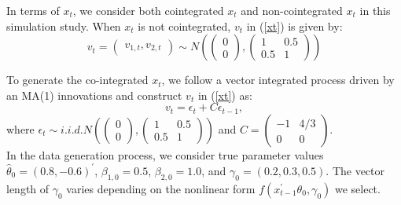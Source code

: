 \documentclass[a4paper,12pt,times,numbered,print,index]{report}
\numberwithin{equation}{section}
\begin{document}
	
	
In terms of $x_t$, we consider both cointegrated $x_t$ and non-cointegrated $x_t$ in this simulation study. When $x_t$ is not cointegrated, $v_t$ in (\ref{xt}) is given by:
$$
	v_{t} =\left(\begin{array}{c}
	v_{1, t}, 
	v_{2, t}
	\end{array}\right) \sim N\left(\left(\begin{array}{c}
	0 \\
	0
	\end{array}\right),\left(\begin{array}{cc}
	1 & 0.5 \nonumber \\
	0.5 & 1
	\end{array}\right)\right)
$$
	
To generate the co-integrated $x_t$, we follow a vector integrated process driven by an MA(1) innovations and construct $v_t$ in (\ref{xt}) as:
$$v_t = \epsilon_t + C\epsilon_{t-1},$$
where $\epsilon_{t} \sim i.i.d. N\left(\left(\begin{array}{c}
0 \\
0
\end{array}\right)
,\left(\begin{array}{cc}1 & 0.5 \\ 0.5 & 1\end{array}\right)\right)$ and $C=\left(\begin{array}{cc} -1  & 4/ 3 \\ 0 & 0\end{array}\right)$. 
\\
	
In the data generation process, we consider true parameter values $\hat{\theta}_0 = (0.8, -0.6)^{\prime}$, $\beta_{1,0} = 0.5$, $\beta_{2,0} = 1.0$, and $\gamma_0 = (0.2, 0.3, 0.5)$. The vector length of $\gamma_{0}$ varies depending on the nonlinear form $f\left(x_{t-1}^{\prime }\theta _{0},\gamma _{0}\right)$ we select. 
	
\end{document}
